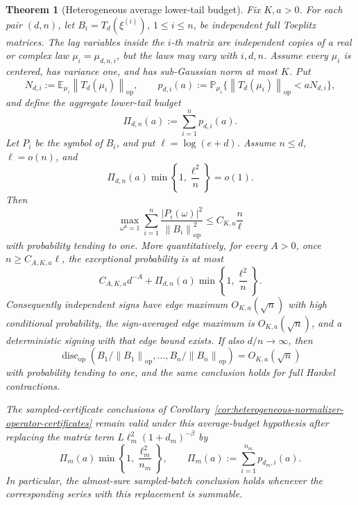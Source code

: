 \documentclass[11pt]{amsart}
\numberwithin{equation}{section}
\newtheorem{theorem}{Theorem}[section]
\theoremstyle{definition}
\theoremstyle{remark}
\newcommand{\op}{\mathrm{op}}
\newcommand{\discop}{\operatorname{disc}_{\op}}
\newcommand{\Prob}{\mathbb P}
\newcommand{\Exp}{\mathbb E}
\newcommand{\norm}[1]{\left\lVert #1\right\rVert}
\newcommand{\abs}[1]{\left\lvert #1\right\rvert}
\begin{document}
\begin{theorem}[Heterogeneous average lower-tail budget]
\label{thm:heterogeneous-average-normalizer-budget}
Fix \(K,a>0\).  For each pair \((d,n)\), let
\(B_i=T_d(\xi^{(i)})\), \(1\le i\le n\), be independent full Toeplitz
matrices.  The lag variables inside the \(i\)-th matrix are independent copies
of a real or complex law \(\mu_i=\mu_{d,n,i}\), but the laws may vary with
\(i,d,n\).  Assume every \(\mu_i\) is centered, has variance one, and has
sub-Gaussian norm at most \(K\).  Put
\[
  N_{d,i}:=\Exp_{\mu_i}\norm{T_d(\mu_i)}_{\op},
  \qquad
  p_{d,i}(a):=
  \Prob_{\mu_i}\{\norm{T_d(\mu_i)}_{\op}<aN_{d,i}\},
\]
and define the aggregate lower-tail budget
\[
  \Pi_{d,n}(a):=\sum_{i=1}^n p_{d,i}(a).
\]
Let \(P_i\) be the symbol of \(B_i\), and put \(\ell=\log(e+d)\).  Assume
\(n\le d\), \(\ell=o(n)\), and
\[
  \Pi_{d,n}(a)\min\left\{1,\frac{\ell^2}{n}\right\}=o(1).
\]
Then
\[
  \max_{\omega^d=1}
  \sum_{i=1}^n
  \frac{\abs{P_i(\omega)}^2}{\norm{B_i}_{\op}^2}
  \le C_{K,a}\frac n\ell
\]
with probability tending to one.  More quantitatively, for every \(A>0\), once
\(n\ge C_{A,K,a}\ell\), the exceptional probability is at most
\[
  C_{A,K,a}d^{-A}
  +\Pi_{d,n}(a)\min\left\{1,\frac{\ell^2}{n}\right\}.
\]
Consequently independent signs have edge maximum \(O_{K,a}(\sqrt n)\) with high
conditional probability, the sign-averaged edge maximum is \(O_{K,a}(\sqrt n)\),
and a deterministic signing with that edge bound exists.  If also
\(d/n\to\infty\), then
\[
  \discop(B_1/\norm{B_1}_{\op},\ldots,B_n/\norm{B_n}_{\op})
  =O_{K,a}(\sqrt n)
\]
with probability tending to one, and the same conclusion holds for full Hankel
contractions.

The sampled-certificate conclusions of
Corollary~\ref{cor:heterogeneous-normalizer-operator-certificates} remain valid
under this average-budget hypothesis after replacing the matrix term
\(L\ell_m^2(1+d_m)^{-\beta}\) by
\[
  \Pi_m(a)\min\left\{1,\frac{\ell_m^2}{n_m}\right\},
  \qquad
  \Pi_m(a):=\sum_{i=1}^{n_m}p_{d_m,i}(a).
\]
In particular, the almost-sure sampled-batch conclusion holds whenever the
corresponding series with this replacement is summable.
\end{theorem}
\end{document}
